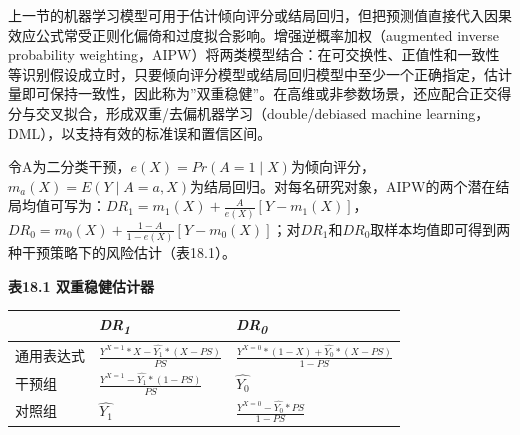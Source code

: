 \documentclass[
  chinese-hans,
  letterpaper,
  DIV=11,
  numbers=noendperiod]{scrreprt}
\newcounter{none} %
\begin{document}
上一节的机器学习模型可用于估计倾向评分或结局回归，但把预测值直接代入因果效应公式常受正则化偏倚和过度拟合影响。增强逆概率加权（augmented
inverse probability
weighting，AIPW）将两类模型结合：在可交换性、正值性和一致性等识别假设成立时，只要倾向评分模型或结局回归模型中至少一个正确指定，估计量即可保持一致性，因此称为''双重稳健''。在高维或非参数场景，还应配合正交得分与交叉拟合，形成双重/去偏机器学习（double/debiased
machine learning，DML），以支持有效的标准误和置信区间。

令A为二分类干预，\(e(X)=Pr(A=1\mid X)\)为倾向评分，\(m_a(X)=E(Y\mid A=a,X)\)为结局回归。对每名研究对象，AIPW的两个潜在结局均值可写为：\(DR_1=m_1(X)+\frac{A}{e(X)}[Y-m_1(X)]\)，\(DR_0=m_0(X)+\frac{1-A}{1-e(X)}[Y-m_0(X)]\)；对\(DR_1\)和\(DR_0\)取样本均值即可得到两种干预策略下的风险估计（表18.1）。

\textbf{表18.1 双重稳健估计器}

{\def\LTcaptype{none} %
\begin{longtable}[]{@{}
  >{\raggedright\arraybackslash}p{}
  >{\raggedright\arraybackslash}p{}
  >{\raggedright\arraybackslash}p{}@{}}
\toprule\noalign{}
\begin{minipage}[b]{\linewidth}\raggedright
\end{minipage} & \begin{minipage}[b]{\linewidth}\raggedright
\emph{DR\textsubscript{1}}
\end{minipage} & \begin{minipage}[b]{\linewidth}\raggedright
\emph{DR\textsubscript{0}}
\end{minipage} \\
\midrule\noalign{}
\endhead
\bottomrule\noalign{}
\endlastfoot
通用表达式 & \(\frac{Y^{X = 1}*X - \widehat{Y_{1}}*(X - PS)}{PS}\) &
\(\frac{Y^{X = 0}*(1 - X) + \widehat{Y_{0}}*(X - PS)}{1 - PS}\) \\
干预组 & \(\frac{Y^{X = 1} - \widehat{Y_{1}}*(1 - PS)}{PS}\) &
\(\widehat{Y_{0}}\) \\
对照组 & \(\widehat{Y_{1}}\) &
\(\frac{Y^{X = 0} - \widehat{Y_{0}}*PS}{1 - PS}\) \\
\end{longtable}
}
\end{document}
